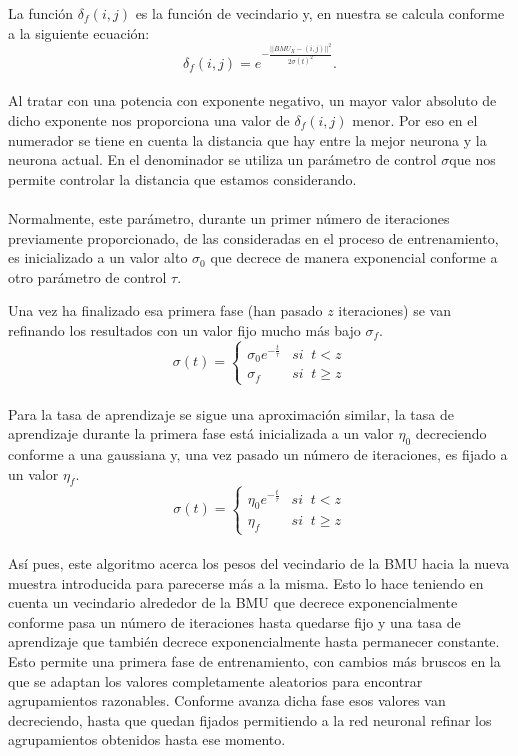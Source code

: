 La función $\delta_f(i,j)$ es la función de vecindario y, en nuestra se calcula conforme a la siguiente ecuación:\\

$$\delta_f(i,j) = e ^{-\frac{||BMU_X-(i,j)||^2}{2\sigma(t)^2}}. $$\\

Al tratar con una potencia con exponente negativo, un mayor valor absoluto de dicho exponente nos proporciona una valor de $\delta_f(i,j)$ menor. Por eso en el numerador se tiene en cuenta la distancia que hay entre la mejor neurona y la neurona actual. En el denominador se utiliza un parámetro de control $\sigma$que nos permite controlar la distancia que estamos considerando.\\\\

Normalmente, este parámetro, durante un primer número de iteraciones previamente proporcionado, de las consideradas en el proceso de entrenamiento, es inicializado a un valor alto $\sigma_0$ que decrece de manera exponencial conforme a otro parámetro de control $\tau$.


Una vez ha finalizado esa primera fase (han pasado $z$ iteraciones) se van refinando los resultados con un valor fijo mucho más bajo $\sigma_f$.\\


$$\sigma(t) = \left\{
\begin{array}{ll}
\sigma_0e^{-\frac{t}{\tau}} & si \;\;t < z\\
\sigma_f & si  \;\; t\geq z
\end{array}
\right.
$$\\

Para la tasa de aprendizaje se sigue una aproximación similar, la tasa de aprendizaje durante la primera fase está inicializada a un valor $\eta_0$ decreciendo conforme a una gaussiana y, una vez pasado un número de iteraciones, es fijado a un valor $\eta_f$. \\
$$\sigma(t) = \left\{
\begin{array}{ll}
\eta_0e^{-\frac{t}{\tau}} & si \;\;t < z\\
\eta_f & si  \;\; t\geq z
\end{array}
\right.$$\\

Así pues, este algoritmo acerca los pesos del vecindario de la BMU hacia la nueva muestra introducida para parecerse más a la misma. Esto lo hace teniendo en cuenta un vecindario alrededor de la BMU que decrece exponencialmente conforme pasa un número de iteraciones hasta quedarse fijo y una tasa de aprendizaje que también decrece exponencialmente hasta permanecer constante. \\Esto permite una primera fase de entrenamiento, con cambios más bruscos en la que se adaptan los valores completamente aleatorios para encontrar agrupamientos razonables. Conforme avanza dicha fase esos valores van decreciendo, hasta que quedan fijados permitiendo a la red neuronal refinar los agrupamientos obtenidos hasta ese momento.



